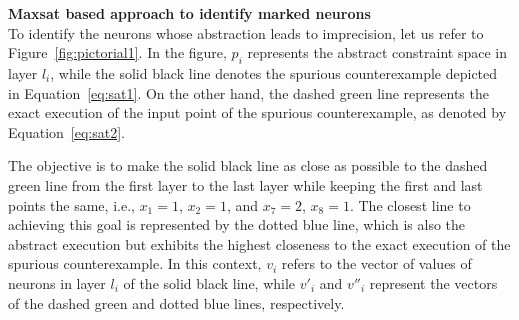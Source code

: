 \noindent\textbf{Maxsat based approach to identify marked neurons}\\
To identify the neurons whose abstraction leads to imprecision, let us refer to Figure~\ref{fig:pictorial1}. 
In the figure, $p_i$ represents the abstract constraint space in layer $l_i$, while the solid black line denotes 
the spurious counterexample depicted in Equation~\ref{eq:sat1}. 
On the other hand, the dashed green line represents the exact execution of the input point of the spurious counterexample, 
as denoted by Equation~\ref{eq:sat2}.

The objective is to make the solid black line as close as possible to the dashed green line from the first layer to the last layer 
while keeping the first and last points the same, i.e., $x_1 = 1$, $x_2 = 1$, and $x_7 = 2$, $x_8 = 1$. 
The closest line to achieving this goal is represented by the dotted blue line, 
which is also the abstract execution but exhibits the highest closeness to the exact execution of the spurious counterexample.
In this context, $v_i$ refers to the vector of values of neurons in layer $l_i$ of the solid black line, 
while $v'_i$ and $v''_i$ represent the vectors of the dashed green and dotted blue lines, respectively.


